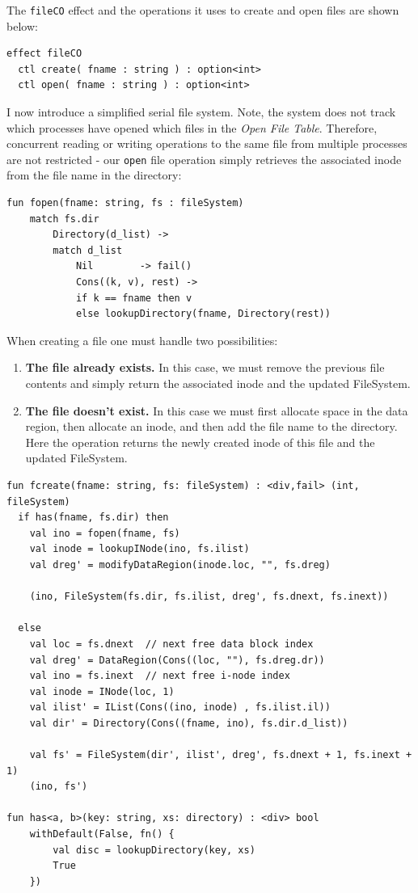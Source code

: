 \documentclass[logo,bsc,singlespacing,parskip]{infthesis}
\begin{document}
The \lstinline{fileCO} effect and the operations it uses to create and open files are shown below:

\begin{lstlisting}
effect fileCO
  ctl create( fname : string ) : option<int>
  ctl open( fname : string ) : option<int>
\end{lstlisting}
I now introduce a simplified serial file system. Note, the system does not track which processes have opened which files in the \textit{Open File Table}. Therefore, concurrent reading or writing operations to the same file from multiple processes are not restricted - our \lstinline{open} file operation simply retrieves the associated inode from the file name in the directory:




\begin{lstlisting}
fun fopen(fname: string, fs : fileSystem) 
    match fs.dir 
        Directory(d_list) ->
        match d_list 
            Nil        -> fail()  
            Cons((k, v), rest) ->
            if k == fname then v
            else lookupDirectory(fname, Directory(rest))

\end{lstlisting}    


When creating a file one must handle two possibilities:
\begin{enumerate}
    \item \textbf{The file already exists.} In this case, we must remove the previous file contents and simply return the associated  inode and the updated FileSystem.
    \item \textbf{The file doesn't exist.} In this case we must first allocate space in the data region, then allocate an inode, and then add the file name to the directory. Here the operation returns the newly created inode of this file and the updated FileSystem.
\end{enumerate}

\begin{lstlisting}
fun fcreate(fname: string, fs: fileSystem) : <div,fail> (int, fileSystem) 
  if has(fname, fs.dir) then 
    val ino = fopen(fname, fs)  
    val inode = lookupINode(ino, fs.ilist)  
    val dreg' = modifyDataRegion(inode.loc, "", fs.dreg)  

    (ino, FileSystem(fs.dir, fs.ilist, dreg', fs.dnext, fs.inext))  
  
  else 
    val loc = fs.dnext  // next free data block index
    val dreg' = DataRegion(Cons((loc, ""), fs.dreg.dr))  
    val ino = fs.inext  // next free i-node index
    val inode = INode(loc, 1)  
    val ilist' = IList(Cons((ino, inode) , fs.ilist.il))  
    val dir' = Directory(Cons((fname, ino), fs.dir.d_list))
    
    val fs' = FileSystem(dir', ilist', dreg', fs.dnext + 1, fs.inext + 1)  
    (ino, fs')

fun has<a, b>(key: string, xs: directory) : <div> bool
    withDefault(False, fn() {
        val disc = lookupDirectory(key, xs)  
        True  
    })
\end{lstlisting}
\end{document}
